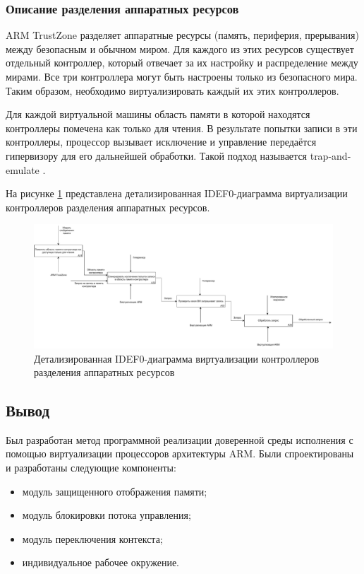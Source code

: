\subsubsection{Описание разделения аппаратных ресурсов}

ARM TrustZone разделяет аппаратные ресурсы (память, периферия, прерывания) между безопасным и обычном миром. Для каждого из этих ресурсов существует отдельный контроллер, который отвечает за их настройку и распределение между мирами. Все три контроллера могут быть настроены только из безопасного мира. Таким образом, необходимо виртуализировать каждый их этих контроллеров.

Для каждой виртуальной машины область памяти в которой находятся контроллеры помечена как только для чтения. В результате попытки записи в эти контроллеры, процессор вызывает исключение и управление передаётся гипервизору для его дальнейшей обработки. Такой подход называется trap-and-emulate \cite{trap-and-emulate}. 

На рисунке \ref{fig:idef0-trap-and-emulate-2} представлена детализированная IDEF0-диаграмма виртуализации контроллеров разделения аппаратных ресурсов. 

\begin{figure}[h]
	\centering
	\includegraphics[width=\textwidth]{img/idef0-trap-and-emulate-2.pdf}
	\caption{Детализированная IDEF0-диаграмма виртуализации контроллеров разделения аппаратных ресурсов}
	\label{fig:idef0-trap-and-emulate-2}
\end{figure}

\subsection*{Вывод}

Был разработан метод программной реализации доверенной среды исполнения с помощью виртуализации процессоров архитектуры ARM. Были спроектированы и разработаны следующие компоненты:

\begin{itemize}
	\item модуль защищенного отображения памяти;
	\item модуль блокировки потока управления;
	\item модуль переключения контекста;
	\item индивидуальное рабочее окружение.
\end{itemize}
 
